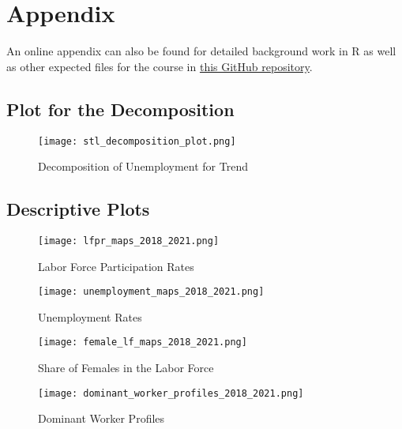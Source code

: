 \documentclass[a4paper,12pt]{article}
\begin{document}



\appendix
\section{Appendix}

An online appendix can also be found for detailed background work in R as well as other expected files for the course in \href{https://github.com/zebozoklu/EC48K}{this GitHub repository}. 

\subsection{Plot for the Decomposition} \label{appendix:decomposition}

\begin{figure} [H]
    \centering
    \texttt{[image: stl\_decomposition\_plot.png]}
    \caption{Decomposition of Unemployment for Trend}
    \label{fig:stl_decomposition_plot}
\end{figure}

\subsection{Descriptive Plots}
\label{appendix:descriptive-plots}

\begin{figure} [H]
    \centering
    \texttt{[image: lfpr\_maps\_2018\_2021.png]}
    \caption{Labor Force Participation Rates}
    \label{fig:lfpr_maps_2018_2021}
\end{figure}

\begin{figure} [H]
    \centering
    \texttt{[image: unemployment\_maps\_2018\_2021.png]}
    \caption{Unemployment Rates}
    \label{fig:unemployment_maps_2018_2021}
\end{figure}

\begin{figure} [H]
    \centering
    \texttt{[image: female\_lf\_maps\_2018\_2021.png]}
    \caption{Share of Females in the Labor Force}
    \label{fig:female_lf_maps_2018_2021}
\end{figure}

\begin{figure} [H]
    \centering
    \texttt{[image: dominant\_worker\_profiles\_2018\_2021.png]}
    \caption{Dominant Worker Profiles}
    \label{fig:dominant_worker_profiles_2018_2021}
\end{figure}
\end{document}
